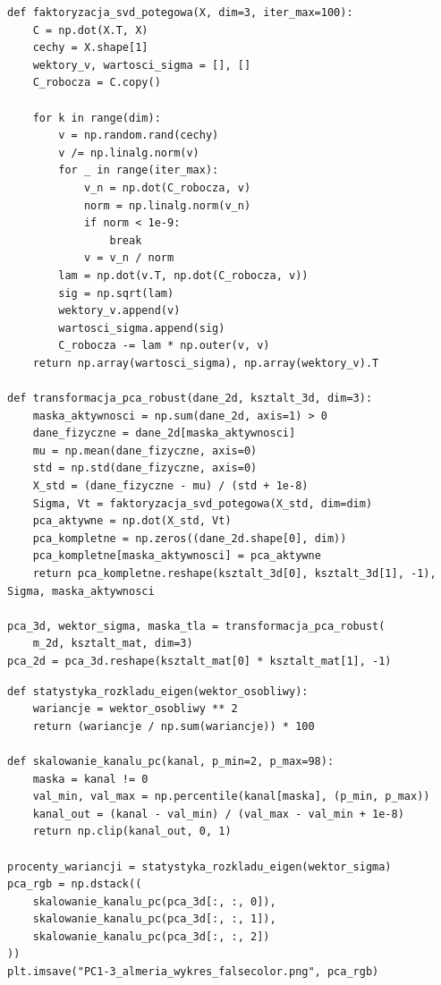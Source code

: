 \documentclass[12pt,a4paper]{article}
\begin{document}
\begin{lstlisting}[caption={Obliczenie PCA metodą SVD.},label={lst:pca}]
def faktoryzacja_svd_potegowa(X, dim=3, iter_max=100):
    C = np.dot(X.T, X)
    cechy = X.shape[1]
    wektory_v, wartosci_sigma = [], []
    C_robocza = C.copy()

    for k in range(dim):
        v = np.random.rand(cechy)
        v /= np.linalg.norm(v)
        for _ in range(iter_max):
            v_n = np.dot(C_robocza, v)
            norm = np.linalg.norm(v_n)
            if norm < 1e-9:
                break
            v = v_n / norm
        lam = np.dot(v.T, np.dot(C_robocza, v))
        sig = np.sqrt(lam)
        wektory_v.append(v)
        wartosci_sigma.append(sig)
        C_robocza -= lam * np.outer(v, v)
    return np.array(wartosci_sigma), np.array(wektory_v).T

def transformacja_pca_robust(dane_2d, ksztalt_3d, dim=3):
    maska_aktywnosci = np.sum(dane_2d, axis=1) > 0
    dane_fizyczne = dane_2d[maska_aktywnosci]
    mu = np.mean(dane_fizyczne, axis=0)
    std = np.std(dane_fizyczne, axis=0)
    X_std = (dane_fizyczne - mu) / (std + 1e-8)
    Sigma, Vt = faktoryzacja_svd_potegowa(X_std, dim=dim)
    pca_aktywne = np.dot(X_std, Vt)
    pca_kompletne = np.zeros((dane_2d.shape[0], dim))
    pca_kompletne[maska_aktywnosci] = pca_aktywne
    return pca_kompletne.reshape(ksztalt_3d[0], ksztalt_3d[1], -1), Sigma, maska_aktywnosci

pca_3d, wektor_sigma, maska_tla = transformacja_pca_robust(
    m_2d, ksztalt_mat, dim=3)
pca_2d = pca_3d.reshape(ksztalt_mat[0] * ksztalt_mat[1], -1)
\end{lstlisting}

\begin{lstlisting}[caption={Wykres wariancji i obraz w fałszywych barwach.},label={lst:variance-falsecolor}]
def statystyka_rozkladu_eigen(wektor_osobliwy):
    wariancje = wektor_osobliwy ** 2
    return (wariancje / np.sum(wariancje)) * 100

def skalowanie_kanalu_pc(kanal, p_min=2, p_max=98):
    maska = kanal != 0
    val_min, val_max = np.percentile(kanal[maska], (p_min, p_max))
    kanal_out = (kanal - val_min) / (val_max - val_min + 1e-8)
    return np.clip(kanal_out, 0, 1)

procenty_wariancji = statystyka_rozkladu_eigen(wektor_sigma)
pca_rgb = np.dstack((
    skalowanie_kanalu_pc(pca_3d[:, :, 0]),
    skalowanie_kanalu_pc(pca_3d[:, :, 1]),
    skalowanie_kanalu_pc(pca_3d[:, :, 2])
))
plt.imsave("PC1-3_almeria_wykres_falsecolor.png", pca_rgb)
\end{lstlisting}
\end{document}
